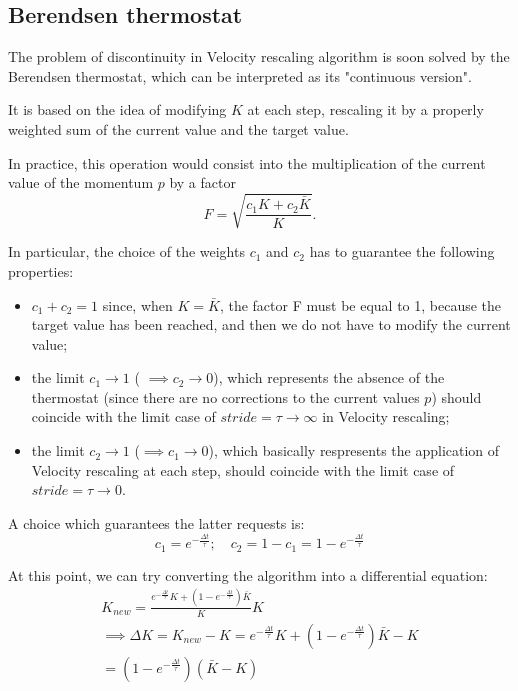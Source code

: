 \subsection{Berendsen thermostat}
The problem of discontinuity in Velocity rescaling algorithm is soon solved by the Berendsen thermostat, which can be interpreted as its "continuous version".

It is based on the idea of modifying $K$ at each step, rescaling it by a properly weighted sum of the current value and the target value.

In practice, this operation would consist into the multiplication of the current value of the momentum $p$ by a factor
\begin{equation}
    F={\sqrt{\frac{c_1K+c_2 \bar K}{K}}}.
\end{equation}

In particular, the choice of the weights ${c_1}$ and ${c_2}$ has to guarantee the following properties:
\begin{itemize}
    \item $c_1+c_2=1$
    since, when $K=\bar K$, the factor F must be equal to 1, because the target value has been reached, and then we do not have to modify the current value;
    \item the limit $c_1 \rightarrow 1$ ( $\implies c_2 \rightarrow 0$), which represents the absence of the thermostat (since there are no corrections to the current values $p$) should coincide with the limit case of $\textit{stride}=\tau \rightarrow \infty$ in Velocity rescaling;
    \item the limit $c_2 \rightarrow 1$ ($\implies c_1 \rightarrow 0$), which basically respresents the application of Velocity rescaling at each step, should coincide with the limit case of $\textit{stride}=\tau \rightarrow 0$.
\end{itemize}

A choice which guarantees the latter requests is:
\begin{equation}
   c_1=e^{-{\frac{\Delta t}{\tau}}} ;\quad
      c_2=1-c_1=1-e^{-{\frac{\Delta t}{\tau}}}
\end{equation}

At this point, we can try converting the algorithm into a differential equation:
\begin{multline*}
    K_{new}={\frac{e^{-{\frac{\Delta t}{\tau}}}K+\left(1-e^{-{\frac{\Delta t}{\tau}}}\right) \bar K}{K}}K \\ 
    \implies \Delta K=K_{new}-K=e^{-{\frac{\Delta t}{\tau}}}K + (1-e^{-{\frac{\Delta t}{\tau}}}) \bar K - K \\
    = (1-e^{-{\frac{\Delta t}{\tau}}} )(\bar K -K) 
\end{multline*}

